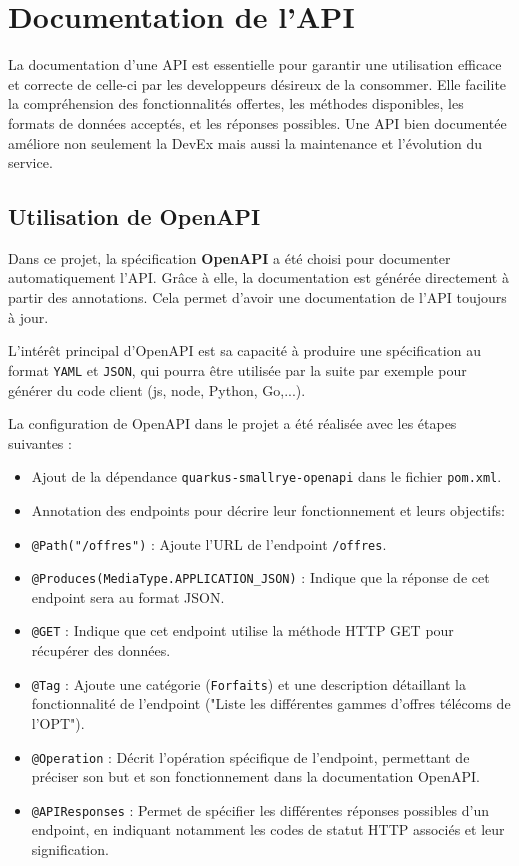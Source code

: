 \documentclass[11pt]{article}
\begin{document}
		\section{Documentation de l'API}
		
		La documentation d'une API est essentielle pour garantir une utilisation efficace et correcte de celle-ci par les developpeurs désireux de la consommer. Elle facilite la compréhension des fonctionnalités offertes, les méthodes disponibles, les formats de données acceptés, et les réponses possibles. Une API bien documentée améliore non seulement la DevEx mais aussi la maintenance et l'évolution du service.
		
		\subsection{Utilisation de OpenAPI}
		
		Dans ce projet, la spécification \textbf{OpenAPI} a été choisi pour documenter automatiquement l'API. Grâce à elle, la documentation est générée directement à partir des annotations. Cela permet d'avoir une documentation de l'API toujours à jour. 
		
		L'intérêt principal d'OpenAPI est sa capacité à produire une spécification au format \texttt{YAML} et \texttt{JSON}, qui pourra être utilisée par la suite par exemple pour générer du code client (js, node, Python, Go,...).
		
		La configuration de OpenAPI dans le projet a été réalisée avec les étapes suivantes :
		\begin{itemize}
			\item Ajout de la dépendance \texttt{quarkus-smallrye-openapi} dans le fichier \texttt{pom.xml}.
			\item Annotation des endpoints pour décrire leur fonctionnement et leurs objectifs:
		\end{itemize}
			
		\begin{itemize}
			\item \texttt{@Path("/offres")} : Ajoute l'URL de l'endpoint \texttt{/offres}.
			\item \texttt{@Produces(MediaType.APPLICATION\_JSON)} : Indique que la réponse de cet endpoint sera au format JSON.
			\item \texttt{@GET} : Indique que cet endpoint utilise la méthode HTTP GET pour récupérer des données.
			\item \texttt{@Tag} : Ajoute une catégorie (\texttt{Forfaits}) et une description détaillant la fonctionnalité de l'endpoint ("Liste les différentes gammes d'offres télécoms de l'OPT").
			\item \texttt{@Operation} : Décrit l'opération spécifique de l'endpoint, permettant de préciser son but et son fonctionnement dans la documentation OpenAPI. \item \texttt{@APIResponses} : Permet de spécifier les différentes réponses possibles d'un endpoint, en indiquant notamment les codes de statut HTTP associés et leur signification. 
		\end{itemize}
	
\end{document}
